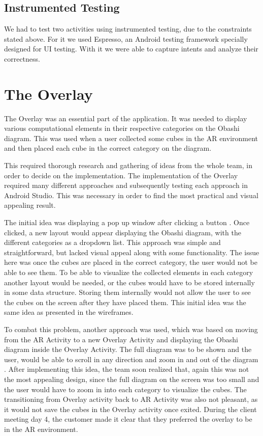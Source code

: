 \documentclass{l3proj}
\begin{document}
\subsection{Instrumented Testing}

We had to test two activities using instrumented testing, due to the constraints
stated above. For it we used Espresso, an Android testing framework specially 
designed for UI testing. With it we were able to capture intents and analyze their
correctness\cite{Espresso}.



\section{The Overlay}

The Overlay was an essential part of the application. It was needed to display
various computational elements in their respective categories on the Obashi diagram. 
This was used when a user collected some cubes in the AR environment and then placed 
each cube in the correct category on the diagram.

This required thorough research and gathering of ideas from the whole team, in order 
to decide on the implementation. The implementation of the Overlay required many different
approaches and subsequently testing each approach in Android Studio. This was necessary in order 
to find the most practical and visual appealing result. 

The initial idea was displaying a pop up window after clicking a button \cite{PopUpWindow}.
Once clicked, a new layout would appear displaying the Obashi diagram, with the
different categories as a dropdown list\cite{DropList}. This approach was simple and 
straightforward, but lacked visual appeal along with some functionality. The issue here 
was once the cubes are placed in the correct category, the user would not be able to see them. 
To be able to visualize the collected elements in each category another layout would be needed,
or the cubes would have to be stored internally in some data structure. Storing them internally 
would not allow the user to see the cubes on the screen after they have placed them. 
This initial idea was the same idea as presented in the wireframes.

To combat this problem, another approach was used, which was based on moving from the
AR Activity to a new Overlay Activity\cite{MovingActivities} and displaying the Obashi 
diagram inside the Overlay Activity. The full diagram was to be shown and the user, would 
be able to scroll in any direction and zoom in and out of the diagram \cite{Zooming}. After 
implementing this idea, the team soon realized that, again this was not the most appealing 
design, since the full diagram on the screen was too small and the user would have to zoom 
in into each category to visualize the cubes. The transitioning from Overlay activity back to 
AR Activity was also not pleasant, as it would not save the cubes in the Overlay activity once 
exited. During the client meeting day 4, the customer made it clear that they preferred the 
overlay to be in the AR environment.
\end{document}
